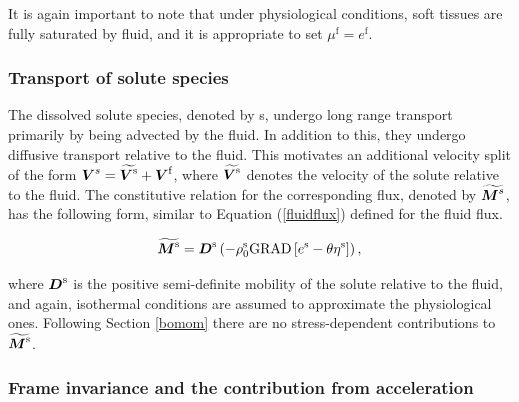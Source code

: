 \noindent It is again important to note that under physiological
conditions, soft tissues are fully saturated by fluid, and it is
appropriate to set $\mu^\mathrm{f} = e^\mathrm{f}$.

\subsubsection{Transport of solute species}
\label{solutespecies}

The dissolved solute species, denoted by s, undergo long range
transport primarily by being 
advected by the fluid. In addition to this, they undergo diffusive
transport relative to the fluid. This motivates an additional velocity
split of the form $\mbox{\boldmath$ V$}^s=\widetilde{\mbox{\boldmath$ V$}^\mathrm{s}}+\mbox{\boldmath$ V$}^\mathrm{f}$,
where $\widetilde{\mbox{\boldmath$ V$}^\mathrm{s}}$ denotes the velocity of the solute
relative to the fluid. The constitutive relation for the corresponding
flux, denoted by $\widetilde{\mbox{\boldmath$ M$}^s}$, has the following form, similar
to Equation (\ref {fluidflux}) defined for the fluid flux.


\begin{equation}
\widetilde{\mbox{\boldmath$ M$}^\mathrm{s}} = \mbox{\boldmath$ D$}^\mathrm{s}\left(
- \rho^\mathrm{s}_0\mathrm{\small{GRAD}}\left[e^\mathrm{s} -
 \theta\eta^\mathrm{s}\right]\right),
\label{soluteflux}
\end{equation}

\noindent where $\mbox{\boldmath$ D$}^\mathrm{s}$ is the positive semi-definite
mobility of the solute relative to the fluid, and again, isothermal
conditions are assumed to approximate the physiological
ones. Following Section \ref{bomom} there are no stress-dependent
contributions to $\widetilde{\mbox{\boldmath$ M$}^\mathrm{s}}$.

\subsubsection{Frame invariance and the contribution from acceleration}
\label{dropping_accn}

